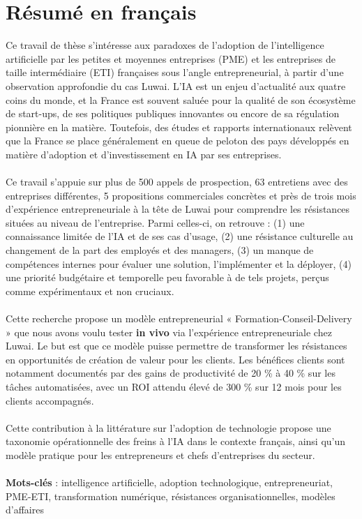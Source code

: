\section*{Résumé en français}

Ce travail de thèse s’intéresse aux paradoxes de l’adoption de l’intelligence artificielle par les petites et moyennes entreprises (PME) et les entreprises de taille intermédiaire (ETI) françaises sous l’angle entrepreneurial, à partir d’une observation approfondie du cas Luwai. L’IA est un enjeu d’actualité aux quatre coins du monde, et la France est souvent saluée pour la qualité de son écosystème de start-ups, de ses politiques publiques innovantes ou encore de sa régulation pionnière en la matière. Toutefois, des études et rapports internationaux relèvent que la France se place généralement en queue de peloton des pays développés en matière d’adoption et d’investissement en IA par ses entreprises.
\\\\
Ce travail s’appuie sur plus de 500 appels de prospection, 63 entretiens avec des entreprises différentes, 5 propositions commerciales concrètes et près de trois mois d’expérience entrepreneuriale à la tête de Luwai pour comprendre les résistances situées au niveau de l’entreprise. Parmi celles-ci, on retrouve :
(1) une connaissance limitée de l’IA et de ses cas d’usage,
(2) une résistance culturelle au changement de la part des employés et des managers,
(3) un manque de compétences internes pour évaluer une solution, l’implémenter et la déployer,
(4) une priorité budgétaire et temporelle peu favorable à de tels projets, perçus comme expérimentaux et non cruciaux.
\\\\
Cette recherche propose un modèle entrepreneurial « Formation-Conseil-Delivery » que nous avons voulu tester \textbf{in vivo} via l’expérience entrepreneuriale chez Luwai. Le but est que ce modèle puisse permettre de transformer les résistances en opportunités de création de valeur pour les clients. Les bénéfices clients sont notamment documentés par des gains de productivité de 20 \% à 40 \% sur les tâches automatisées, avec un ROI attendu élevé de 300 \% sur 12 mois pour les clients accompagnés.
\\\\
Cette contribution à la littérature sur l’adoption de technologie propose une taxonomie opérationnelle des freins à l’IA dans le contexte français, ainsi qu’un modèle pratique pour les entrepreneurs et chefs d’entreprises du secteur.
\\\\
\textbf{Mots-clés} : intelligence artificielle, adoption technologique, entrepreneuriat, PME-ETI, transformation numérique, résistances organisationnelles, modèles d’affaires


